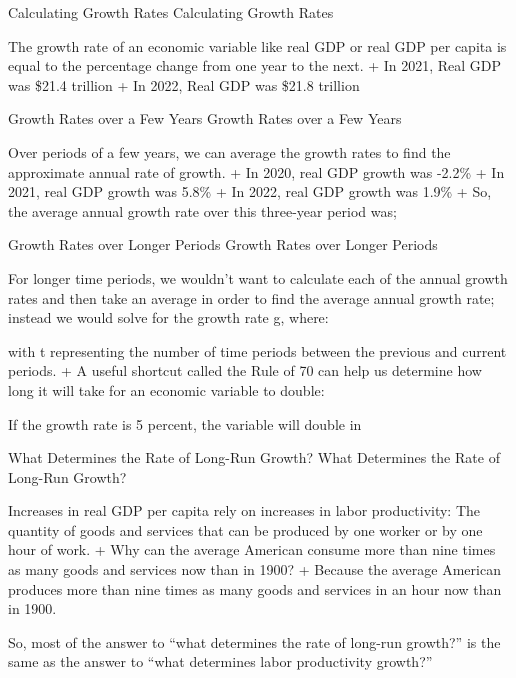 \documentclass[
  12pt,
  ignorenonframetext,
]{beamer}
\begin{document}
\begin{frame}{Calculating Growth Rates}
\label{calculating-growth-rates}
Calculating Growth Rates

The growth rate of an economic variable like real GDP or real GDP per
capita is equal to the percentage change from one year to the next. + In
2021, Real GDP was \$21.4 trillion + In 2022, Real GDP was \$21.8
trillion
\end{frame}

\begin{frame}{Growth Rates over a Few Years}
\label{growth-rates-over-a-few-years}
Growth Rates over a Few Years

Over periods of a few years, we can average the growth rates to find the
approximate annual rate of growth. + In 2020, real GDP growth was -2.2\%
+ In 2021, real GDP growth was 5.8\% + In 2022, real GDP growth was
1.9\% + So, the average annual growth rate over this three-year period
was;
\end{frame}

\begin{frame}{Growth Rates over Longer Periods}
\label{growth-rates-over-longer-periods}
Growth Rates over Longer Periods

For longer time periods, we wouldn't want to calculate each of the
annual growth rates and then take an average in order to find the
average annual growth rate; instead we would solve for the growth rate
g, where:

with t representing the number of time periods between the previous and
current periods. + A useful shortcut called the Rule of 70 can help us
determine how long it will take for an economic variable to double:

If the growth rate is 5 percent, the variable will double in
\end{frame}

\begin{frame}{What Determines the Rate of Long-Run Growth?}
\label{what-determines-the-rate-of-long-run-growth}
What Determines the Rate of Long-Run Growth?

Increases in real GDP per capita rely on increases in labor
productivity: The quantity of goods and services that can be produced by
one worker or by one hour of work. + Why can the average American
consume more than nine times as many goods and services now than in
1900? + Because the average American produces more than nine times as
many goods and services in an hour now than in 1900.

So, most of the answer to ``what determines the rate of long-run
growth?'' is the same as the answer to ``what determines labor
productivity growth?''
\end{frame}
\end{document}
